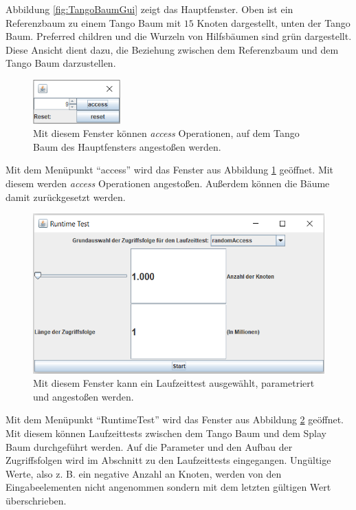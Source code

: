 \documentclass[a4paper,12pt]{article}
\begin{document}
\noindent Abbildung \ref{fig:TangoBaumGui} zeigt das Hauptfenster. Oben ist ein Referenzbaum zu einem Tango Baum mit  $15$ Knoten dargestellt, unten der Tango Baum. Preferred children und die Wurzeln von Hilfsbäumen sind grün dargestellt.
Diese Ansicht dient dazu, die Beziehung zwischen dem Referenzbaum und dem Tango Baum darzustellen.

\begin{figure}[H]
	\centering
	\includegraphics[width=0.3\textwidth]{Medien/laufzeittest/accessGUI}
	\caption{Mit diesem Fenster können  \textit{access} Operationen, auf dem Tango Baum des Hauptfensters angestoßen werden.}
	\label{fig:accessGui}
\end{figure}
\noindent Mit dem Menüpunkt \enquote{access} wird das Fenster aus Abbildung \ref{fig:accessGui} geöffnet. Mit diesem werden \textit{access} Operationen angestoßen. Außerdem können die Bäume damit zurückgesetzt werden.

\begin{figure}[H]
	\centering
	\includegraphics[width=1\textwidth]{Medien/laufzeittest/RuntimeGui}
	\caption{Mit diesem Fenster kann ein Laufzeittest ausgewählt, parametriert und angestoßen werden.}
	\label{fig:RuntimeGui}
\end{figure}

\noindent Mit dem Menüpunkt \enquote{RuntimeTest} wird das Fenster aus Abbildung \ref{fig:RuntimeGui} geöffnet. Mit diesem können Laufzeittests zwischen dem Tango Baum und dem Splay Baum  durchgeführt werden. Auf die Parameter und den Aufbau der Zugriffsfolgen wird im Abschnitt zu den Laufzeittests eingegangen. Ungültige Werte, also z. B. ein negative Anzahl an Knoten, werden von den Eingabeelementen nicht angenommen sondern mit dem letzten gültigen Wert überschrieben.
\end{document}
